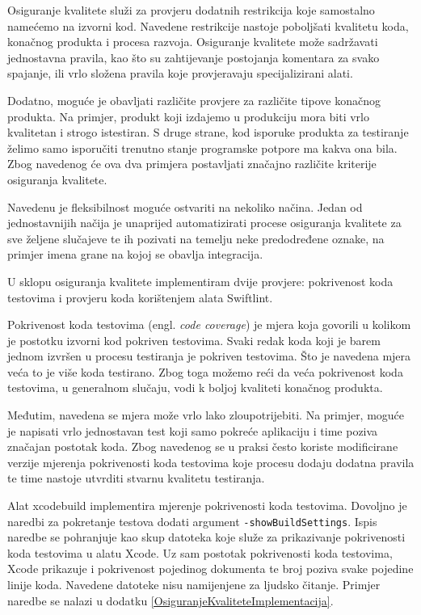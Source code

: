 \documentclass[times, utf8, diplomski, numeric]{fer}
\newcommand{\eng}[1]{(engl. \textit{#1})}
\begin{document}
Osiguranje kvalitete služi za provjeru dodatnih restrikcija koje samostalno namećemo na izvorni kod. Navedene restrikcije nastoje poboljšati kvalitetu koda, konačnog produkta i procesa razvoja. Osiguranje kvalitete može sadržavati jednostavna pravila, kao što su zahtijevanje postojanja komentara za svako spajanje, ili vrlo složena pravila koje provjeravaju specijalizirani alati.

Dodatno, moguće je obavljati različite provjere za različite tipove konačnog produkta. Na primjer, produkt koji izdajemo u produkciju mora biti vrlo kvalitetan i strogo istestiran. S druge strane, kod isporuke produkta za testiranje želimo samo isporučiti trenutno stanje programske potpore ma kakva ona bila. Zbog navedenog će ova dva primjera postavljati značajno različite kriterije osiguranja kvalitete.

Navedenu je fleksibilnost moguće ostvariti na nekoliko načina. Jedan od jednostavnijih načija je unaprijed automatizirati procese osiguranja kvalitete za sve željene slučajeve te ih pozivati na temelju neke predodređene oznake, na primjer imena grane na kojoj se obavlja integracija.

U sklopu osiguranja kvalitete implementiram dvije provjere: pokrivenost koda testovima i provjeru koda korištenjem alata Swiftlint.

Pokrivenost koda testovima \eng{code coverage} je mjera koja govorili u kolikom je postotku izvorni kod pokriven testovima. Svaki redak koda koji je barem jednom izvršen u procesu testiranja je pokriven testovima. Što je navedena mjera veća to je više koda testirano. Zbog toga možemo reći da veća pokrivenost koda testovima, u generalnom slučaju, vodi k boljoj kvaliteti konačnog produkta.

Međutim, navedena se mjera može vrlo lako zloupotrijebiti. Na primjer, moguće je napisati vrlo jednostavan test koji samo pokreće aplikaciju i time poziva značajan postotak koda. Zbog navedenog se u praksi često koriste modificirane verzije mjerenja pokrivenosti koda testovima koje procesu dodaju dodatna pravila te time nastoje utvrditi stvarnu kvalitetu testiranja\citep{wiki:CodeCoverage}.

Alat xcodebuild implementira mjerenje pokrivenosti koda testovima. Dovoljno je naredbi za pokretanje testova dodati argument \verb|-showBuildSettings|. Ispis naredbe se pohranjuje kao skup datoteka koje služe za prikazivanje pokrivenosti koda testovima u alatu Xcode. Uz sam postotak pokrivenosti koda testovima, Xcode prikazuje i pokrivenost pojedinog dokumenta te broj poziva svake pojedine linije koda. Navedene datoteke nisu namijenjene za ljudsko čitanje. Primjer naredbe se nalazi u dodatku \ref{OsiguranjeKvaliteteImplementacija}.
\end{document}

